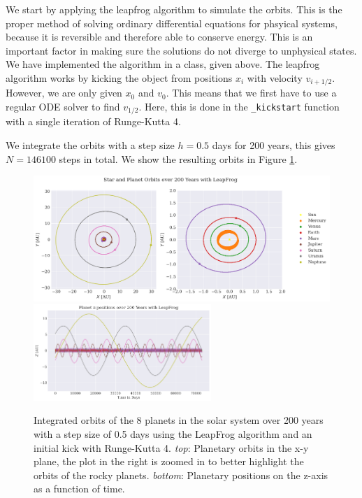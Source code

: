 We start by applying the leapfrog algorithm to simulate the orbits. This is the proper method of solving ordinary differential equations for phsyical systems, because it is reversible and therefore able to conserve energy. This is an important factor in making sure the solutions do not diverge to unphysical states. We have implemented the algorithm in a class, given above. The leapfrog algorithm works by kicking the object from positions $x_i$ with velocity $v_{i+1/2}$. However, we are only given $x_0$ and $v_0$. This means that we first have to use a regular ODE solver to find $v_{1/2}$. Here, this is done in the \texttt{\_kickstart} function with a single iteration of Runge-Kutta 4.

We integrate the orbits with a step size $h = 0.5$ days for 200 years, this gives $N = 146100$ steps in total. We show the resulting orbits in Figure \ref{fig:orbits_lf}.

\begin{figure}
    \centering
    \includegraphics[width=\textwidth]{results/orbits_lf.png}
    \includegraphics[width=0.6\textwidth]{results/zplane.png}
    \caption{Integrated orbits of the 8 planets in the solar system over 200 years with a step size of 0.5 days using the LeapFrog algorithm and an initial kick with Runge-Kutta 4. \textit{top}: Planetary orbits in the x-y plane, the plot in the right is zoomed in to better highlight the orbits of the rocky planets. \textit{bottom}: Planetary positions on the z-axis as a function of time.}
    \label{fig:orbits_lf}
\end{figure}

